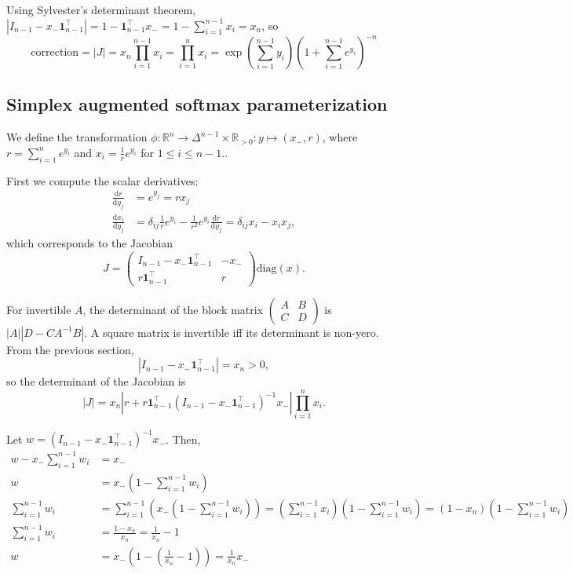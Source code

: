 \documentclass[11pt]{article}
\begin{document}
Using Sylvester's determinant theorem,
$|I_{n-1} - x_- \boldsymbol{1}_{n-1}^\top| = 1 -
\boldsymbol{1}_{n-1}^\top x_- = 1 - \sum_{i=1}^{n-1} x_i = x_n$, so
$$\mathrm{correction} = |J| = x_n \prod_{i=1}^{n-1} x_i = \prod_{i=1}^{n} x_i = \exp\left(\sum_{i=1}^{n-1} y_i\right) \left(1 + \sum_{i=1}^{n-1} e^{y_i}\right)^{-n}$$


\subsection{Simplex augmented softmax parameterization}

We define the transformation
$\phi: \mathbb{R}^n \to \Delta^{n-1} \times \mathbb{R}_{>0}: y \mapsto
(x_-, r)$, where $r = \sum_{i=1}^n e^{y_i}$ and
$x_i = \frac{1}{r} e^{y_i}$ for $1 \le i \le n-1$..

First we compute the scalar derivatives:
\[
\begin{aligned}
  \frac{\mathrm{d} r}{\mathrm{d} y_j}
  &= e^{y_j} = r x_j
  \\
  \frac{\mathrm{d} x_i}{\mathrm{d} y_j}
  &= \delta_{ij} \frac{1}{r} e^{y_i} - \frac{1}{r^2} e^{y_i} \frac{\mathrm{d} r}{\mathrm{d} y_j} = \delta_{ij} x_i - x_i x_j,
\end{aligned}
\]
which corresponds to the Jacobian
\[
  J = \begin{pmatrix}I_{n-1} - x_- \boldsymbol{1}_{n-1}^\top & -x_- \\
    r \boldsymbol{1}_{n-1}^\top & r \end{pmatrix} \mathrm{diag}(x).
\]

For invertible $A$, the determinant of the block matrix
$\begin{pmatrix}A & B \\ C & D\end{pmatrix}$ is $|A| |D-CA^{-1}B|$.  A
square matrix is invertible iff its determinant is non-yero.  From the
previous section,
\[
  |I_{n-1} - x_- \boldsymbol{1}_{n-1}^\top| = x_n > 0,
\]
so the determinant of the Jacobian is
\[
  |J| = x_n \left|r + r \boldsymbol{1}_{n-1}^\top (I_{n-1} - x_-
    \boldsymbol{1}_{n-1}^\top)^{-1} x_-\right|
  \prod_{i=1}^n x_i.
\]

Let $w = (I_{n-1} - x_- \boldsymbol{1}_{n-1}^\top)^{-1} x_-$. Then,
\[
\begin{aligned}
    w - x_- \sum_{i=1}^{n-1} w_i &= x_-\\
    w &= x_- \left(1 - \sum_{i=1}^{n-1} w_i\right)\\
    \sum_{i=1}^{n-1} w_i &= \sum_{i=1}^{n-1} \left( x_- (1 - \sum_{i=1}^{n-1} w_i) \right) = \left(\sum_{i=1}^{n-1} x_i \right) \left(1 - \sum_{i=1}^{n-1} w_i\right) = (1 - x_n)  \left(1 - \sum_{i=1}^{n-1} w_i\right)\\
    \sum_{i=1}^{n-1} w_i &= \frac{1 - x_n}{x_n} = \frac{1}{x_n} - 1\\
    w &= x_- \left(1 - \left(\frac{1}{x_n} - 1\right)\right) = \frac{1}{x_n} x_-
  \end{aligned}
\]
\end{document}
